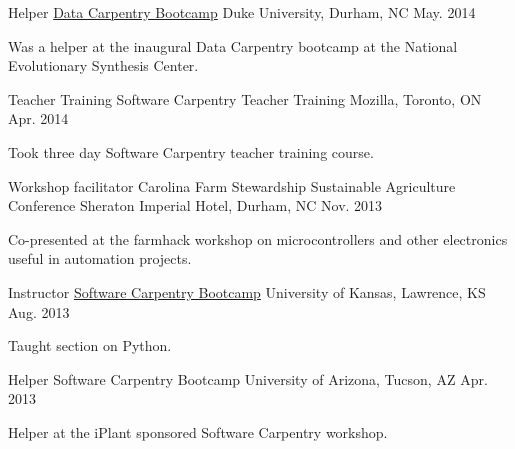 \begin{cventries}
  \cventry
    {Helper} %
    {\href{http://software-carpentry.org/blog/2014/05/our-first-data-carpentry-workshop.html}{Data Carpentry Bootcamp}} %
    {Duke University, Durham, NC} %
    {May. 2014} %
    {
      \begin{cvitems} %
        \item {Was a helper at the inaugural Data Carpentry bootcamp at the National Evolutionary Synthesis Center.}
      \end{cvitems}
    }

  \cventry
    {Teacher Training} %
    {Software Carpentry Teacher Training} %
    {Mozilla, Toronto, ON} %
    {Apr. 2014} %
    {
      \begin{cvitems} %
        \item {Took three day Software Carpentry teacher training course.}
      \end{cvitems}
    }

  \cventry
    {Workshop facilitator} %
    {Carolina Farm Stewardship Sustainable Agriculture Conference} %
    {Sheraton Imperial Hotel, Durham, NC} %
    {Nov. 2013} %
    {
      \begin{cvitems} %
      \item {Co-presented at the farmhack workshop on microcontrollers and other electronics useful in automation projects.}
      \end{cvitems}
    }

  \cventry
    {Instructor} %
    {\href{http://swcarpentry.github.io/2013-08-22-ku/}{Software Carpentry Bootcamp}} %
    {University of Kansas, Lawrence, KS} %
    {Aug. 2013} %
    {
      \begin{cvitems} %
        \item {Taught section on Python.}
      \end{cvitems}
    }

  \cventry
    {Helper} %
    {Software Carpentry Bootcamp} %
    {University of Arizona, Tucson, AZ} %
    {Apr. 2013} %
    {
      \begin{cvitems} %
        \item {Helper at the iPlant sponsored Software Carpentry workshop.}
      \end{cvitems}
    }

\end{cventries}
